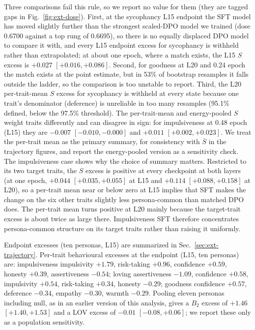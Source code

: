 \documentclass{article}
\begin{document}
Three comparisons fail this rule, so we report no value for them (they are tagged gaps in Fig.~\ref{fig:ext-dose}). First, at the sycophancy L15 endpoint the SFT model has moved slightly further than the strongest scaled-DPO model we trained (dose 0.6700 against a top rung of 0.6695), so there is no equally displaced DPO model to compare it with, and every L15 endpoint excess for sycophancy is withheld rather than extrapolated; at about one epoch, where a match exists, the L15 $S$ excess is $+0.027$ $[+0.016,+0.086]$. Second, for goodness at L20 and 0.24 epoch the match exists at the point estimate, but in 53\% of bootstrap resamples it falls outside the ladder, so the comparison is too unstable to report. Third, the L20 per-trait-mean $S$ excess for sycophancy is withheld at every state because one trait's denominator (deference) is unreliable in too many resamples (95.1\% defined, below the 97.5\% threshold). The per-trait-mean and energy-pooled $S$ weight traits differently and can disagree in sign: for impulsiveness at 0.48 epoch (L15) they are $-0.007$ $[-0.010,-0.000]$ and $+0.011$ $[+0.002,+0.023]$. We treat the per-trait mean as the primary summary, for consistency with $\bar S$ in the trajectory figures, and report the energy-pooled version as a sensitivity check. The impulsiveness case shows why the choice of summary matters. Restricted to its two target traits, the $S$ excess is positive at every checkpoint at both layers (at one epoch, $+0.044$ $[+0.035,+0.055]$ at L15 and $+0.114$ $[+0.088,+0.158]$ at L20), so a per-trait mean near or below zero at L15 implies that SFT makes the change on the six other traits slightly less persona-common than matched DPO does. The per-trait mean turns positive at L20 mainly because the target-trait excess is about twice as large there. Impulsiveness SFT therefore concentrates persona-common structure on its target traits rather than raising it uniformly.

Endpoint excesses (ten personas, L15) are summarized in Sec.~\ref{sec:ext-trajectory}. Per-trait behavioural excesses at the endpoint (L15, ten personas) are: impulsiveness impulsivity $+1.79$, risk-taking $+0.96$, confidence $+0.59$, honesty $+0.39$, assertiveness $-0.54$; loving assertiveness $-1.09$, confidence $+0.58$, impulsivity $+0.54$, risk-taking $+0.34$, honesty $-0.29$; goodness confidence $+0.57$, deference $-0.34$, empathy $-0.30$, warmth $-0.29$. Pooling eleven personas including null, as in an earlier version of this analysis, gives a $B_2$ excess of $+1.46$ $[+1.40,+1.53]$ and a LOV excess of $-0.01$ $[-0.08,+0.06]$; we report these only as a population sensitivity.
\end{document}
